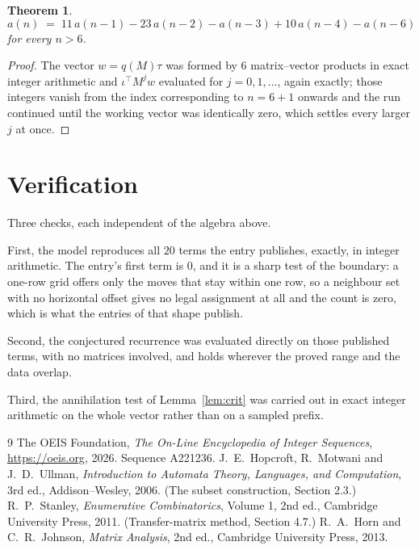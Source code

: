 \documentclass[11pt,a4paper]{article}
\theoremstyle{plain}
\newtheorem{theorem}{Theorem}
\theoremstyle{definition}
\begin{document}
\begin{theorem}
\[
a(n)\;=\;11\,a(n-1) - 23\,a(n-2) - a(n-3) + 10\,a(n-4) - a(n-6)
\]
for every $n>6$.
\end{theorem}

\begin{proof}
The vector $w=q(M)\tau$ was formed by $6$ matrix--vector products in exact integer
arithmetic and $\iota^{\!\top}M^{j}w$ evaluated for $j=0,1,\dots$, again exactly; those
integers vanish from the index corresponding to $n=6+1$ onwards and the run continued
until the working vector was identically zero, which settles every larger $j$ at once.
\end{proof}

\section{Verification}

Three checks, each independent of the algebra above.

First, the model reproduces all $20$ terms the entry publishes, exactly, in integer
arithmetic. The entry's first term is $0$, and it is a sharp test of the boundary: a
one-row grid offers only the moves that stay within one row, so a neighbour set with no
horizontal offset gives no legal assignment at all and the count is zero, which is what the
entries of that shape publish.

Second, the conjectured recurrence was evaluated directly on those published terms, with no
matrices involved, and holds wherever the proved range and the data overlap.

Third, the annihilation test of Lemma~\ref{lem:crit} was carried out in exact integer
arithmetic on the whole vector rather than on a sampled prefix.

\begin{thebibliography}{9}
 The OEIS Foundation, \emph{The On-Line Encyclopedia of Integer
Sequences}, \url{https://oeis.org}, 2026. Sequence A221236.
 J.~E.~Hopcroft, R.~Motwani and J.~D.~Ullman, \emph{Introduction to Automata
Theory, Languages, and Computation}, 3rd ed., Addison--Wesley, 2006. (The subset
construction, Section 2.3.)
 R.~P.~Stanley, \emph{Enumerative Combinatorics}, Volume 1, 2nd ed.,
Cambridge University Press, 2011. (Transfer-matrix method, Section 4.7.)
 R.~A.~Horn and C.~R.~Johnson, \emph{Matrix Analysis}, 2nd ed., Cambridge
University Press, 2013.
\end{thebibliography}
\end{document}

